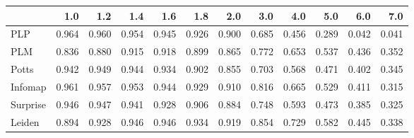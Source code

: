 \begin{tabular}{lrrrrrrrrrrr}
\toprule
{} &   1.0 &   1.2 &   1.4 &   1.6 &   1.8 &   2.0 &   3.0 &   4.0 &   5.0 &   6.0 &   7.0 \\
\midrule
PLP      & 0.964 & 0.960 & 0.954 & 0.945 & 0.926 & 0.900 & 0.685 & 0.456 & 0.289 & 0.042 & 0.041 \\
PLM      & 0.836 & 0.880 & 0.915 & 0.918 & 0.899 & 0.865 & 0.772 & 0.653 & 0.537 & 0.436 & 0.352 \\
Potts    & 0.942 & 0.949 & 0.944 & 0.934 & 0.902 & 0.855 & 0.703 & 0.568 & 0.471 & 0.402 & 0.345 \\
Infomap  & 0.961 & 0.957 & 0.953 & 0.944 & 0.929 & 0.910 & 0.816 & 0.665 & 0.529 & 0.411 & 0.315 \\
Surprise & 0.946 & 0.947 & 0.941 & 0.928 & 0.906 & 0.884 & 0.748 & 0.593 & 0.473 & 0.385 & 0.325 \\
Leiden   & 0.894 & 0.928 & 0.946 & 0.946 & 0.934 & 0.919 & 0.854 & 0.729 & 0.582 & 0.445 & 0.338 \\
\bottomrule
\end{tabular}
